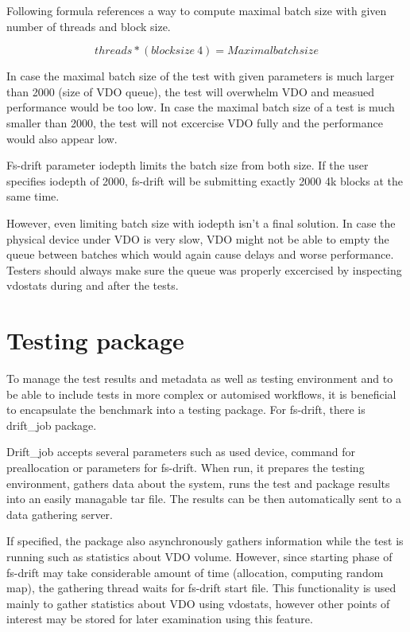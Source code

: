 \documentclass[
  color, %
  table, %
  lof,   %
  lot,   %
]{fithesis3}
\begin{document}
Following formula references a way to compute maximal batch size with given number of threads and block size.

\[ threads * (blocksize \ 4) = Maximal batch size \]

In case the maximal batch size of the test with given parameters is much larger than 2000 (size of VDO queue), the test will overwhelm VDO and measued performance would be too low. In case the maximal batch size of a test is much smaller than 2000, the test will not excercise VDO fully and the performance would also appear low.

Fs-drift parameter iodepth limits the batch size from both size. If the user specifies iodepth of 2000, fs-drift will be submitting exactly 2000 4k blocks at the same time.

However, even limiting batch size with iodepth isn't a final solution. In case the physical device under VDO is very slow, VDO might not be able to empty the queue between batches which would again cause delays and worse performance. Testers should always make sure the queue was properly excercised by inspecting vdostats during and after the tests.

\section{Testing package}
To manage the test results and metadata as well as testing environment and to be able to include tests in more complex or automised workflows, it is beneficial to encapsulate the benchmark into a testing package. For fs-drift, there is drift\_job package.

Drift\_job accepts several parameters such as used device, command for preallocation or parameters for fs-drift. When run, it prepares the testing environment, gathers data about the system, runs the test and package results into an easily managable tar file. The results can be then automatically sent to a data gathering server.

If specified, the package also asynchronously gathers information while the test is running such as statistics about VDO volume. However, since starting phase of fs-drift may take considerable amount of time (allocation, computing random map), the gathering thread waits for fs-drift start file. This functionality is used mainly to gather statistics about VDO using vdostats, however other points of interest may be stored for later examination using this feature.

\end{document}
